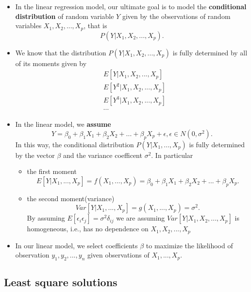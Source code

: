 \begin{refsection}
\begin{note}\hfill
\begin{itemize}
	\item In the linear regression model, our ultimate goal is to model the \textbf{conditional distribution} of random variable $Y$ given by the observations of random variables $X_1,X_2,...,X_p$, that is
	$$P(Y|X_1,X_2,...,X_p).$$
	\item  We know that the distribution $P(Y|X_1,X_2,...,X_p)$ is fully determined by all of its moments given by
	\begin{align*}
	&E[Y|X_1,X_2,...,X_p] \\
	&E[Y^2|X_1,X_2,...,X_p] \\
	&E[Y^3|X_1,X_2,...,X_p] \\
	&\cdots
	\end{align*} 
	\item In the linear model, we \textbf{assume} 
	$$Y = \beta_0 + \beta_1 X_1 +\beta_2 X_2 + ... +\beta_{p} X_p + \epsilon, \epsilon \in N(0,\sigma^2).$$
	In this way, the conditional distribution $P(Y|X_1,...,X_p)$ is fully determined by the vector $\beta$ and the variance coefficent $\sigma^2$. 
	In particular
	\begin{itemize}
		\item the first moment
	$$E[Y|X_1,...,X_p] = f(X_1,...,X_p)=\beta_0 + \beta_1 X_1 +\beta_2 X_2 + ... +\beta_{p} X_p.$$ 
	\item the second moment(variance)
	$$Var[Y|X_1,...,X_p] = g(X_1,...,X_p) = \sigma^2.$$ 
		By assuming $E[\epsilon_i\epsilon_j]=\sigma^2\delta_{ij}$ we are assuming $Var[Y|X_1,X_2,...,X_p]$ is homogeneous, i.e., has no dependence on $X_1,X_2,...,X_p$
	\end{itemize} 
	\item In our linear model, we select coefficients $\beta$ to maximize the likelihood of observation $y_1,y_2,...,y_n$ given observations of $X_1,...,X_p$.
\end{itemize}	
\end{note}



\subsection{Least square solutions}

\end{refsection}
